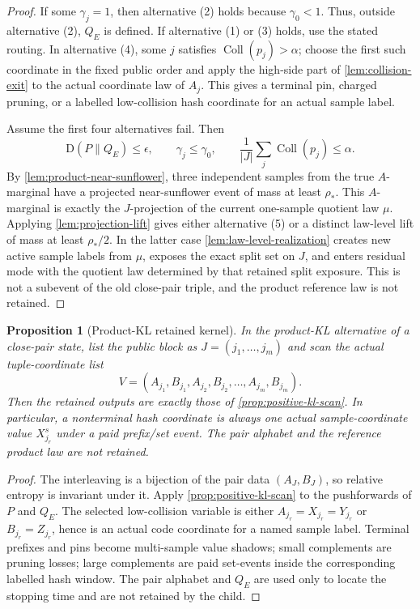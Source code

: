 \documentclass[11pt]{article}
\newcommand{\Cref}[1]{\ref{#1}}
\newtheorem{proposition}[theorem]{Proposition}
\theoremstyle{remark}
\newcommand{\KL}{\mathrm D}
\newcommand{\Coll}{\operatorname{Coll}}
\begin{document}
\begin{proof}
If some $\gamma_j=1$, then alternative (2) holds because $\gamma_0<1$.  Thus, outside alternative (2), $Q_E$ is defined.  If alternative (1) or (3) holds, use the stated routing.  In alternative (4), some $j$ satisfies $\Coll(p_j)>\alpha$; choose the first such coordinate in the fixed public order and apply the high-side part of \Cref{lem:collision-exit} to the actual coordinate law of $A_j$.  This gives a terminal pin, charged pruning, or a labelled low-collision hash coordinate for an actual sample label.

Assume the first four alternatives fail.  Then
\[
        \KL(P\|Q_E)\le\epsilon,
        \qquad
        \gamma_j\le\gamma_0,
        \qquad
        \frac{1}{|J|}\sum_j\Coll(p_j)\le\alpha.
\]
By \Cref{lem:product-near-sunflower}, three independent samples from the true $A$-marginal have a projected near-sunflower event of mass at least $\rho_*$.  This $A$-marginal is exactly the $J$-projection of the current one-sample quotient law $\mu$.  Applying \Cref{lem:projection-lift} gives either alternative (5) or a distinct law-level lift of mass at least $\rho_*/2$.  In the latter case \Cref{lem:law-level-realization} creates new active sample labels from $\mu$, exposes the exact split set on $J$, and enters residual mode with the quotient law determined by that retained split exposure.  This is not a subevent of the old close-pair triple, and the product reference law is not retained.
\end{proof}

\begin{proposition}[Product-KL retained kernel]\label{prop:product-kl}
In the product-KL alternative of a close-pair state, list the public block as $J=(j_1,\ldots,j_m)$ and scan the actual tuple-coordinate list
\[
        V=(A_{j_1},B_{j_1},A_{j_2},B_{j_2},\ldots,A_{j_m},B_{j_m}).
\]
Then the retained outputs are exactly those of \Cref{prop:positive-kl-scan}.  In particular, a nonterminal hash coordinate is always one actual sample-coordinate value $X^s_{j_r}$ under a paid prefix/set event.  The pair alphabet and the reference product law are not retained.
\end{proposition}

\begin{proof}
The interleaving is a bijection of the pair data $(A_J,B_J)$, so relative entropy is invariant under it.  Apply \Cref{prop:positive-kl-scan} to the pushforwards of $P$ and $Q_E$.  The selected low-collision variable is either $A_{j_r}=X_{j_r}=Y_{j_r}$ or $B_{j_r}=Z_{j_r}$, hence is an actual code coordinate for a named sample label.  Terminal prefixes and pins become multi-sample value shadows; small complements are pruning losses; large complements are paid set-events inside the corresponding labelled hash window.  The pair alphabet and $Q_E$ are used only to locate the stopping time and are not retained by the child.
\end{proof}
\end{document}
